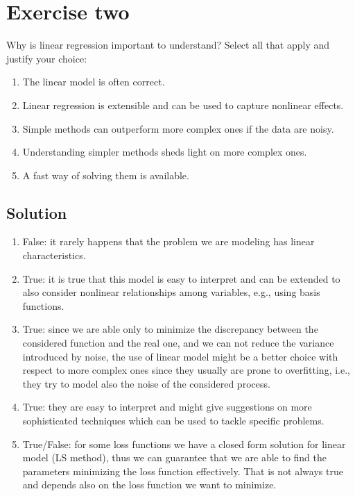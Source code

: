 \section{Exercise two}

Why is linear regression important to understand? 
Select all that apply and justify your choice:
\begin{enumerate}
    \item The linear model is often correct.
    \item Linear regression is extensible and can be used to capture nonlinear effects.
    \item Simple methods can outperform more complex ones if the data are noisy.
    \item Understanding simpler methods sheds light on more complex ones.
    \item A fast way of solving them is available.
\end{enumerate}

\subsection{Solution}
\begin{enumerate}
    \item False: it rarely happens that the problem we are modeling has linear characteristics.
    \item True: it is true that this model is easy to interpret and can be extended to also consider nonlinear relationships among variables, e.g., using basis functions.
    \item True: since we are able only to minimize the discrepancy between the considered function and the real one, and we can not reduce the variance introduced by noise, the use of linear model might be a better choice with respect to more complex ones since they usually are prone to overfitting, i.e., they try to model also the noise of the considered process.
    \item True: they are easy to interpret and might give suggestions on more sophisticated techniques which can be used to tackle specific problems.
    \item True/False: for some loss functions we have a closed form solution for linear model (LS method), thus we can guarantee that we are able to find the parameters minimizing the loss function effectively. 
        That is not always true and depends also on the loss function we want to minimize.
\end{enumerate}